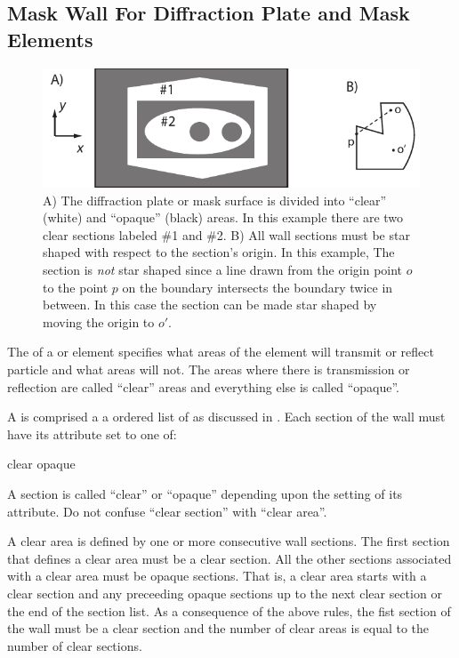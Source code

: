 \subsection{Mask Wall For Diffraction Plate and Mask Elements}
\label{s:masking.wall}

\begin{figure}[tb]
  \centering
  \includegraphics[width=5in]{diffraction-plate.pdf}
  \caption[Example mask wall]{
A) The diffraction plate or mask surface is divided into ``clear'' (white) and
``opaque'' (black) areas. In this example there are two clear sections
labeled \#1 and \#2. B) All wall sections must be star shaped with
respect to the section's origin. In this example, The section is {\em
not} star shaped since a line drawn from the origin point $o$ to the
point $p$ on the boundary intersects the boundary twice in between. In
this case the section can be made star shaped by moving the origin to
$o'$.
  }
  \label{f:diff.plate}
\end{figure}

The  of a  or  element
specifies what areas of the
element will transmit or reflect particle and what areas will not. The
areas where there is transmission or reflection are called ``clear''
areas and everything else is called ``opaque''. 

A  is comprised a a ordered list of  as
discussed in . Each section of the wall must have
its  attribute set to one of:
\begin{example}
  clear
  opaque
\end{example}
A section is called ``clear'' or ``opaque'' depending upon the setting
of its  attribute. Do not confuse ``clear section'' with 
``clear area''.

A clear area is defined by one or more consecutive wall sections. The
first section that defines a clear area must be a clear section.  All
the other sections associated with a clear area must be opaque sections.
That is, a clear area starts with a clear section and any preceeding
opaque sections up to the next clear section or the end of the section
list. As a consequence of the above rules, the fist section of the
wall must be a clear section and the number of clear areas is equal to
the number of clear sections.

